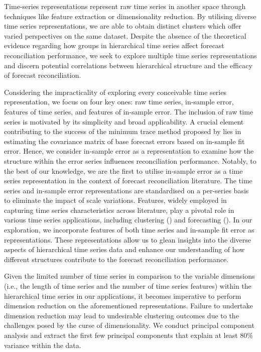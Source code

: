 \documentclass[a4paper,review,12pt,authoryear]{elsarticle}
\begin{document}
Time-series representations represent raw time series in another space through techniques like feature extraction or dimensionality reduction. By utilising diverse time series representations, we are able to obtain distinct clusters which offer varied perspectives on the same dataset. 
Despite the absence of the theoretical evidence regarding how groups in hierarchical time series affect forecast reconciliation performance, we seek to explore multiple time series representations and discern potential correlations between hierarchical structure and the efficacy of forecast reconciliation.

Considering the impracticality of exploring every conceivable time series representation, we focus on four key ones: raw time series, in-sample error, features of time series, and features of in-sample error.
The inclusion of raw time series is motivated by its simplicity and broad applicability.
A crucial element contributing to the success of the minimum trace method proposed by \cite{wickramasuriyaOptimalForecastReconciliation2019} lies in estimating the covariance matrix of base forecast errors based on in-sample fit error. Hence, we consider in-sample error as a representation to examine how the structure within the error series influences reconciliation performance. Notably, to the best of our knowledge, we are the first to utilise in-sample error as a time series representation in the context of forecast reconciliation literature.
The time series and in-sample error representations are standardised on a per-series basis to eliminate the impact of scale variations.
Features, widely employed in capturing time series characteristics across literature, play a pivotal role in various time series applications, including clustering (\citealp{tianoFeatTSFeaturebasedTime2021}) and forecasting (\citealp{wangUncertaintyEstimationFeaturebased2022, liFeaturebasedIntermittentDemand2023}). In our exploration, we incorporate features of both time series and in-sample fit error as representations. These representations allow us to glean insights into the diverse aspects of hierarchical time series data and enhance our understanding of how different structures contribute to the forecast reconciliation performance.


Given the limited number of time series in comparison to the variable dimensions (i.e., the length of time series and the number of time series features) within the hierarchical time series in our applications, it becomes imperative to perform dimension reduction on the aforementioned representations. Failure to undertake dimension reduction may lead to undesirable clustering outcomes due to the challenges posed by the curse of dimensionality. 
We conduct principal component analysis and extract the first few principal components that explain at least $80$\% variance within the data.
\end{document}
